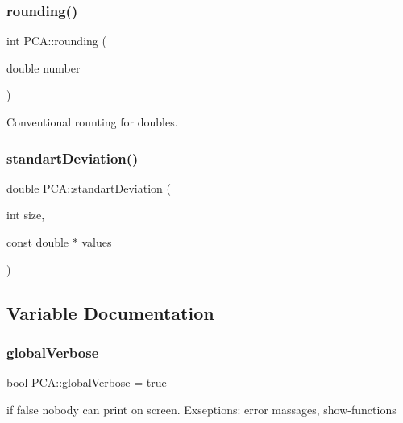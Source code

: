 \hypertarget{namespace_p_c_a_acd05fa0d440ac1781a76499f3cdb3f38}{}\label{namespace_p_c_a_acd05fa0d440ac1781a76499f3cdb3f38} 
\subsubsection{\texorpdfstring{rounding()}{rounding()}}
{\footnotesize\ttfamily int P\+C\+A\+::rounding (\begin{DoxyParamCaption}\item[{double}]{number }\end{DoxyParamCaption})}



Conventional rounting for doubles. 

\hypertarget{namespace_p_c_a_ae9120f4f9875a87768cc3090196892a8}{}\label{namespace_p_c_a_ae9120f4f9875a87768cc3090196892a8} 
\subsubsection{\texorpdfstring{standart\+Deviation()}{standartDeviation()}}
{\footnotesize\ttfamily double P\+C\+A\+::standart\+Deviation (\begin{DoxyParamCaption}\item[{int}]{size,  }\item[{const double $\ast$}]{values }\end{DoxyParamCaption})}



\subsection{Variable Documentation}
\hypertarget{namespace_p_c_a_a01cf2b18a2d7669f5be721c2142bf67d}{}\label{namespace_p_c_a_a01cf2b18a2d7669f5be721c2142bf67d} 
\subsubsection{\texorpdfstring{global\+Verbose}{globalVerbose}}
{\footnotesize\ttfamily bool P\+C\+A\+::global\+Verbose = true}



if false nobody can print on screen. Exseptions\+: error massages, show-\/functions 

